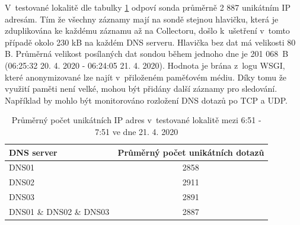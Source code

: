 \documentclass[thesis=M,czech]{src/FITthesis}[2019/12/23]
\begin{document}
V~testované lokalitě dle tabulky \ref{tab:uniq_ip} odpoví sonda průměrně 2 887 unikátním IP adresám. Tím že všechny záznamy mají na sondě stejnou hlavičku, která je zduplikována ke každému záznamu až na Collectoru, došlo k~ušetření v~tomto případě okolo 230 kB na každém DNS serveru. Hlavička bez dat má velikosti 80 B. Průměrná velikost posílaných dat sondou během jednoho dne je 201 068~B (06:25:32 20. 4. 2020 - 06:24:05 21. 4. 2020). Hodnota je brána z~logu WSGI, které anonymizované lze najít v~přiloženém paměťovém médiu. Díky tomu že využití paměti není velké, mohou být přidány další záznamy pro sledování. Například by mohlo být monitorováno rozložení DNS dotazů po TCP a UDP.

\begin{table}\centering	
 	\begin{tabular}{|l|c|}\hline
 		\textbf{DNS server}	& \textbf{Průměrný počet unikátních dotazů} \tabularnewline  \hline
 		DNS01 &  2858 \tabularnewline \hline
 		DNS02 &  2911 \tabularnewline \hline 
 		DNS03 &  2891 \tabularnewline \Xhline{5\arrayrulewidth}
 		DNS01 \& DNS02 \& DNS03 &  2887 \tabularnewline \hline
 	\end{tabular}
 	\caption[]{Průměrný počet unikátních IP adres v~testované lokalitě mezi 6:51 - 7:51 ve dne 21. 4. 2020} 
 	\label{tab:uniq_ip}
\end{table}
\end{document}
